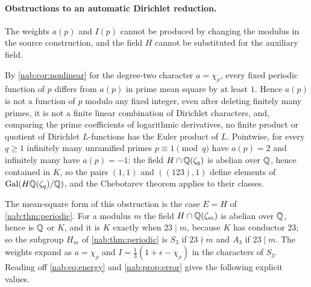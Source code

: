 \paragraph{Obstructions to an automatic Dirichlet reduction.}
The weights $a(p)$ and $I(p)$ cannot be produced by changing the modulus in the source construction, and
the field $H$ cannot be substituted for the auxiliary field.

\begin{remark}\label{hec:prop:modulus}
By \cref{nab:cor:nonlinear} for the degree-two character $a=\chi_\rho$, every fixed periodic function of
$p$ differs from $a(p)$ in prime mean square by at least $1$. Hence $a(p)$ is not a function of $p$ modulo
any fixed integer, even after deleting finitely many primes, it is not a finite linear combination of
Dirichlet characters, and, comparing the prime coefficients of logarithmic derivatives, no finite product
or quotient of Dirichlet $L$-functions has the Euler product of $L$. Pointwise, for every $q\ge1$
infinitely many unramified primes $p\equiv1\pmod q$ have $a(p)=2$ and infinitely many have $a(p)=-1$:
the field $H\cap\mathbb{Q}(\zeta_q)$ is abelian over $\mathbb{Q}$, hence contained in $K$, so the pairs $(1,1)$ and
$((123),1)$ define elements of $\operatorname{Gal}(H\mathbb{Q}(\zeta_q)/\mathbb{Q})$, and the Chebotarev theorem applies to their
classes.
\end{remark}

The mean-square form of this obstruction is the case $E=H$ of \cref{nab:thm:periodic}. For a modulus $m$
the field $H\cap\mathbb{Q}(\zeta_m)$ is abelian over $\mathbb{Q}$, hence is $\mathbb{Q}$ or $K$, and it is $K$ exactly when
$23\mid m$, because $K$ has conductor $23$; so the subgroup $H_m$ of \cref{nab:thm:periodic} is $S_3$ if
$23\nmid m$ and $A_3$ if $23\mid m$. The weights expand as $a=\chi_\rho$ and
$I=\tfrac13(1+\epsilon-\chi_\rho)$ in the characters of $S_3$. Reading off \eqref{nab:eq:energy} and
\cref{nab:prop:error} gives the following explicit values.

